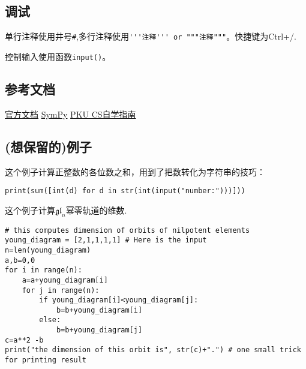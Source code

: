\documentclass[11pt]{amsart}
\begin{document}
\subsection{调试}
单行注释使用井号\lstinline|#|,多行注释使用\lstinline|'''注释''' or """注释"""|。快捷键为Ctrl+/.

控制输入使用函数\lstinline|input()|。

\subsection{参考文档}
\href{https://docs.python.org/zh-cn/3/tutorial/index.html}{官方文档}
\href{https://docs.sympy.org/latest/tutorial/index.html#tutorial}{SymPy}
\href{https://pkuflyingpig.github.io/pku-cs-self-learning/}{PKU CS自学指南}
\subsection{(想保留的)例子}
这个例子计算正整数的各位数之和，用到了把数转化为字符串的技巧：
\begin{lstlisting}[language=iPython]
print(sum([int(d) for d in str(int(input("number:")))]))
\end{lstlisting}
这个例子计算$\mathfrak{gl}_n$幂零轨道的维数.
\begin{lstlisting}[language=iPython]
# this computes dimension of orbits of nilpotent elements
young_diagram = [2,1,1,1,1] # Here is the input
n=len(young_diagram)
a,b=0,0
for i in range(n):
    a=a+young_diagram[i]
    for j in range(n):
        if young_diagram[i]<young_diagram[j]:
            b=b+young_diagram[i]
        else:
            b=b+young_diagram[j]
c=a**2 -b
print("the dimension of this orbit is", str(c)+".") # one small trick for printing result
\end{lstlisting}
\end{document}
